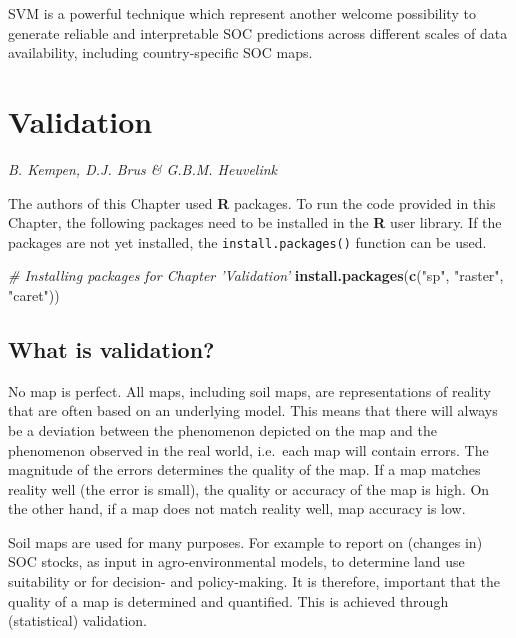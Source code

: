 \documentclass[10pt,b5paper,]{book}
\newenvironment{Shaded}{\begin{snugshade}}{\end{snugshade}}
\newcommand{\CommentTok}[1]{\textcolor[rgb]{0.56,0.35,0.01}{\textit{#1}}}
\newcommand{\KeywordTok}[1]{\textcolor[rgb]{0.13,0.29,0.53}{\textbf{#1}}}
\newcommand{\NormalTok}[1]{#1}
\newcommand{\StringTok}[1]{\textcolor[rgb]{0.31,0.60,0.02}{#1}}
\theoremstyle{definition}
\theoremstyle{definition}
\theoremstyle{definition}
\theoremstyle{remark}
\begin{document}
SVM is a powerful technique which represent another welcome possibility
to generate reliable and interpretable SOC predictions across different
scales of data availability, including country-specific SOC maps.

\hypertarget{chvalidation}{%
\chapter{Validation}\label{chvalidation}}

\emph{B. Kempen, D.J. Brus \& G.B.M. Heuvelink}

The authors of this Chapter used \textbf{R} packages. To run the code
provided in this Chapter, the following packages need to be installed in
the \textbf{R} user library. If the packages are not yet installed, the
\texttt{install.packages()} function can be used.

\begin{Shaded}
\begin{Highlighting}[]
\CommentTok{# Installing packages for Chapter 'Validation'}
\KeywordTok{install.packages}\NormalTok{(}\KeywordTok{c}\NormalTok{(}\StringTok{"sp"}\NormalTok{, }\StringTok{"raster"}\NormalTok{, }\StringTok{"caret"}\NormalTok{))}
\end{Highlighting}
\end{Shaded}

\hypertarget{what-is-validation}{%
\section{What is validation?}\label{what-is-validation}}

No map is perfect. All maps, including soil maps, are representations of
reality that are often based on an underlying model. This means that
there will always be a deviation between the phenomenon depicted on the
map and the phenomenon observed in the real world, i.e.~each map will
contain errors. The magnitude of the errors determines the quality of
the map. If a map matches reality well (the error is small), the quality
or accuracy of the map is high. On the other hand, if a map does not
match reality well, map accuracy is low.

Soil maps are used for many purposes. For example to report on (changes
in) SOC stocks, as input in agro-environmental models, to determine land
use suitability or for decision- and policy-making. It is therefore,
important that the quality of a map is determined and quantified. This
is achieved through (statistical) validation.
\end{document}
